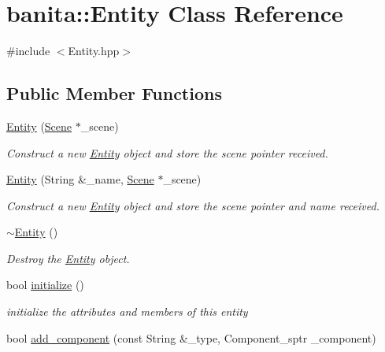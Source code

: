 \hypertarget{classbanita_1_1_entity}{}\section{banita\+::Entity Class Reference}
\label{classbanita_1_1_entity}


{\ttfamily \#include $<$Entity.\+hpp$>$}

\subsection*{Public Member Functions}
\begin{DoxyCompactItemize}
\item 
\mbox{\hyperlink{classbanita_1_1_entity_aea5e59bc61fed11d1c23cd6108613b37}{Entity}} (\mbox{\hyperlink{classbanita_1_1_scene}{Scene}} $\ast$\+\_\+scene)
\begin{DoxyCompactList}\small\item\em Construct a new \mbox{\hyperlink{classbanita_1_1_entity}{Entity}} object and store the scene pointer received. \end{DoxyCompactList}\item 
\mbox{\hyperlink{classbanita_1_1_entity_a01b2f03d793f06528e1d4c4112d4f62d}{Entity}} (String \&\+\_\+name, \mbox{\hyperlink{classbanita_1_1_scene}{Scene}} $\ast$\+\_\+scene)
\begin{DoxyCompactList}\small\item\em Construct a new \mbox{\hyperlink{classbanita_1_1_entity}{Entity}} object and store the scene pointer and name received. \end{DoxyCompactList}\item 
\mbox{\hyperlink{classbanita_1_1_entity_ab426b4d2def681300d007e27626f70da}{$\sim$\+Entity}} ()
\begin{DoxyCompactList}\small\item\em Destroy the \mbox{\hyperlink{classbanita_1_1_entity}{Entity}} object. \end{DoxyCompactList}\item 
bool \mbox{\hyperlink{classbanita_1_1_entity_a1e070b4458ecebabbec87e90a3235f8e}{initialize}} ()
\begin{DoxyCompactList}\small\item\em initialize the attributes and members of this entity \end{DoxyCompactList}\item 
bool \mbox{\hyperlink{classbanita_1_1_entity_a37c77bf77f2148e886571ef988b98749}{add\+\_\+component}} (const String \&\+\_\+type, Component\+\_\+sptr \+\_\+component)

\end{DoxyCompactItemize}
